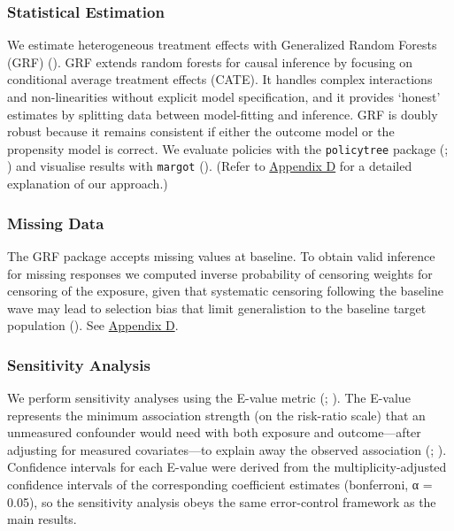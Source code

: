 \documentclass[
  single column]{article}
\begin{document}
\subsubsection{Statistical Estimation}\label{statistical-estimation}

We estimate heterogeneous treatment effects with Generalized Random
Forests (GRF) (). GRF
extends random forests for causal inference by focusing on conditional
average treatment effects (CATE). It handles complex interactions and
non-linearities without explicit model specification, and it provides
`honest' estimates by splitting data between model-fitting and
inference. GRF is doubly robust because it remains consistent if either
the outcome model or the propensity model is correct. We evaluate
policies with the \texttt{policytree} package
(; )
and visualise results with \texttt{margot}
(). (Refer to
\hyperref[appendix-explain-grf]{Appendix D} for a detailed explanation
of our approach.)

\subsubsection{Missing Data}\label{missing-data}

The GRF package accepts missing values at baseline. To obtain valid
inference for missing responses we computed inverse probability of
censoring weights for censoring of the exposure, given that systematic
censoring following the baseline wave may lead to selection bias that
limit generalistion to the baseline target population
(). See
\hyperref[appendix-explain-grf]{Appendix D}.

\subsubsection{Sensitivity Analysis}\label{sensitivity-analysis}

We perform sensitivity analyses using the E-value metric
(;
). The E-value
represents the minimum association strength (on the risk-ratio scale)
that an unmeasured confounder would need with both exposure and
outcome---after adjusting for measured covariates---to explain away the
observed association (; ).
Confidence intervals for each E-value were derived from the
multiplicity-adjusted confidence intervals of the corresponding
coefficient estimates (bonferroni, α = 0.05), so the sensitivity
analysis obeys the same error-control framework as the main results.
\end{document}
